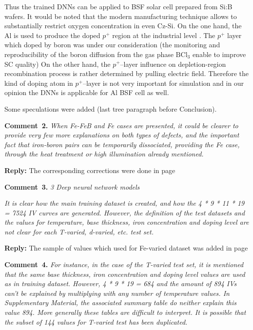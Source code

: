 \documentclass[num-refs]{wiley-article} %
\begin{document}
Thus the trained DNNs can be applied to BSF solar cell prepared from Si:B wafers.
It would be noted that the modern manufacturing technique allows to substantially restrict
oxygen concentration in even Cz-Si.
On the one hand,  the Al is used to produce the doped $p^+$ region
at the industrial level \cite{GreenRew2019,WilsonRew2020}.
The $p^{+}$ layer which doped by boron was under our consideration 
(the monitoring and reproducibility of the boron diffusion from the gas phase 
$\mathrm{B}\mathrm{Cl}_3$ enable to improve SC quality)
On the other hand, the $p^+$--layer influence on depletion-region recombination
process is rather determined by pulling electric field.
Therefore the kind of doping atom in $p^+$--layer is not very important for simulation
and in our opinion the  DNNs is applicable for Al BSF cell as well.


Some speculations were added (last tree paragraph before Conclusion).


\vspace{1cm}
\noindent
\textcolor[rgb]{0.00,0.50,1.00}{\textbf{Comment~2.}}
\emph{When Fe-FeB and Fe cases are presented, it could be clearer to provide very few more explanations on both types of defects,
and the important fact that iron-boron pairs can be temporarily dissociated, providing the Fe case,
through the heat treatment or high illumination already mentioned. }

\vspace{0.5cm}
\noindent
\textcolor[rgb]{0.51,0.00,0.00}{\textbf{Reply:}}
The corresponding corrections were done in page


\vspace{1cm}
\noindent
\textcolor[rgb]{0.00,0.50,1.00}{\textbf{Comment~3.}}
\emph{3 Deep neural network models}

\emph{
It is clear how the main training dataset is created, and how the 4 * 9 * 11 * 19 = 7524 IV curves are generated.
However, the definition of the test datasets and the values for temperature,
base thickness, iron concentration and doping level are not clear for each T-varied, d-varied, etc. test set. }

\vspace{0.5cm}
\noindent
\textcolor[rgb]{0.51,0.00,0.00}{\textbf{Reply:}}
The sample of values which used for Fe-varied dataset was added in page  





\vspace{1cm}
\noindent
\textcolor[rgb]{0.00,0.50,1.00}{\textbf{Comment~4.}}
\emph{
For instance, in the case of the T-varied test set, it is mentioned that the same base thickness,
iron concentration and doping level values are used as in training dataset.
However, 4 * 9 * 19 = 684 and the amount of 894 IVs can’t be explained by multiplying with any number of temperature values.
In Supplementary Material, the associated summary table do neither explain this value 894. More generally these tables are difficult to interpret. It is possible that the subset of 144 values for T-varied test has been duplicated. }
\end{document}
